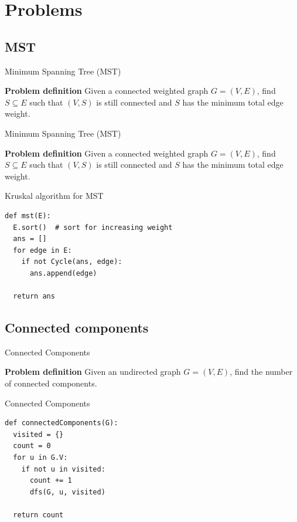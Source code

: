 \documentclass[compress]{beamer}
\begin{document}
\section{Problems}

\subsection{MST}
\begin{frame}{Minimum Spanning Tree (MST)}
  \begin{block}{\textbf{Problem definition}}
    Given a connected weighted graph $G = (V, E)$, find $S \subseteq E$ such that $(V, S)$ is still connected and $S$ has the minimum total edge weight.
  \end{block}
  \begin{center}
  
  \end{center}
\end{frame}

\begin{frame}{Minimum Spanning Tree (MST)}
  \begin{block}{\textbf{Problem definition}}
    Given a connected weighted graph $G = (V, E)$, find $S \subseteq E$ such that $(V, S)$ is still connected and $S$ has the minimum total edge weight.
  \end{block}
  \begin{center}
  
  \end{center}
\end{frame}

\begin{frame}[fragile]{Kruskal algorithm for MST}
\begin{lstlisting}
def mst(E):
  E.sort()  # sort for increasing weight
  ans = []
  for edge in E:
    if not Cycle(ans, edge):
      ans.append(edge)

  return ans
\end{lstlisting}
\end{frame}

\subsection{Connected components}
\begin{frame}{Connected Components}
  \begin{block}{\textbf{Problem definition}}
    Given an undirected graph $G = (V, E)$, find the number of connected components.
  \end{block}
  \begin{center}
  
  \end{center}
\end{frame}

\begin{frame}[fragile]{Connected Components}
\begin{lstlisting}
def connectedComponents(G):
  visited = {}
  count = 0
  for u in G.V:
    if not u in visited:
      count += 1
      dfs(G, u, visited)

  return count
\end{lstlisting}
\end{frame}
\end{document}
